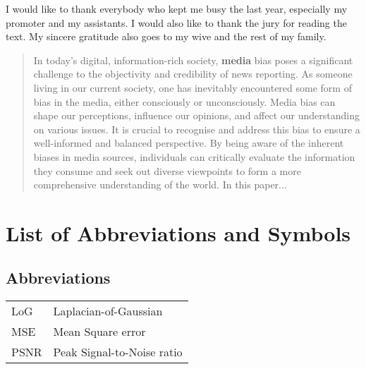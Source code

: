 \documentclass[master=eelt,masteroption=ec]{kulemt}
\begin{document}
\begin{preface}
    I would like to thank everybody who kept me busy the last year,
    especially my promoter and my assistants. I would also like to thank the
    jury for reading the text. My sincere gratitude also goes to my wive and
    the rest of my family. \cite{aires-2020-information}
\end{preface}

\tableofcontents*

\begin{abstract}
    In today's digital, information-rich society, \textbf{media} bias poses a significant challenge to the objectivity and credibility of news reporting. As someone living in our current society, one has inevitably encountered some form of bias in the media, either consciously or unconsciously. Media bias can shape our perceptions, influence our opinions, and affect our understanding on various issues. It is crucial to recognise and address this bias to ensure a well-informed and balanced perspective. By being aware of the inherent biases in media sources, individuals can critically evaluate the information they consume and seek out diverse viewpoints to form a more comprehensive understanding of the world.
    In this paper...
\end{abstract}

\listoffiguresandtables
\chapter{List of Abbreviations and Symbols}
\section*{Abbreviations}
\begin{flushleft}
    \renewcommand{\arraystretch}{1.1}
    \begin{tabularx}{\textwidth}{@{}p{12mm}X@{}}
        LoG  & Laplacian-of-Gaussian      \\
        MSE  & Mean Square error          \\
        PSNR & Peak Signal-to-Noise ratio \\
    \end{tabularx}
\end{flushleft}
\end{document}
